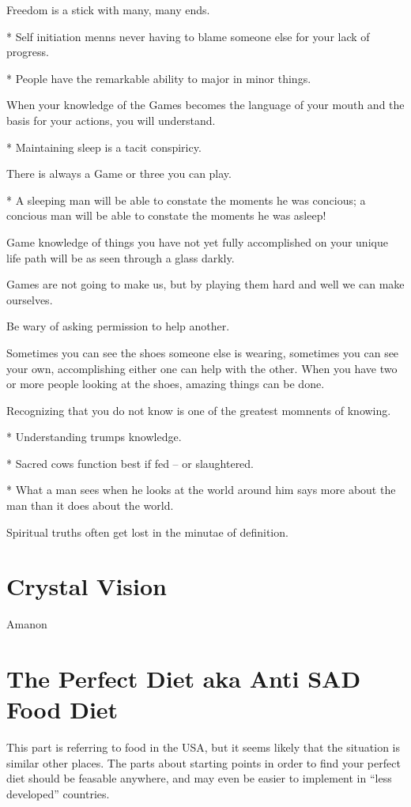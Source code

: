 \documentclass[12pt,letterpaper]{book}
\begin{document}
Freedom is a stick with many, many ends.

* Self initiation menns never having to blame someone else for your lack of progress.

* People have the remarkable ability to major in minor things.

When your knowledge of the Games becomes the language of your mouth and the basis for your actions, you will understand.

* Maintaining sleep is a tacit conspiricy.

There is always a Game or three you can play.

* A sleeping man will be able to constate the moments he was concious; a concious man will be able to constate the moments he was asleep!

Game knowledge of things you have not yet fully accomplished on your unique life path will be as seen through a glass darkly.

Games are not going to make us, but by playing them hard and well we can make ourselves.

Be wary of asking permission to help another.

Sometimes you can see the shoes someone else is wearing, sometimes you can see your own, accomplishing either one can help with the other. When you have two or more people looking at the shoes, amazing things can be done.

Recognizing that you do not know is one of the greatest momnents of knowing.

* Understanding trumps knowledge.

* Sacred cows function best if fed -- or slaughtered.

* What a man sees when he looks at the world around him says more about the man than it does about the world.

Spiritual truths often get lost in the minutae of definition.

\chapter{Crystal Vision}

Amanon


\chapter{The Perfect Diet aka Anti SAD Food Diet}

This part is referring to food in the USA, but it seems likely that the situation is similar other places. The parts about starting points in order to find your perfect diet should be feasable anywhere, and may even be easier to implement in ``less developed'' countries.
\end{document}
